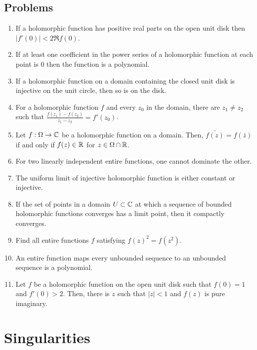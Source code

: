 \documentclass{../note}
\begin{document}
\begin{prb}
\end{prb}


\begin{prb}
\end{prb}




\section*{Problems}

\begin{enumerate}
\item If a holomorphic function has positive real parts on the open unit disk then $|f'(0)|<2\Re f(0)$.
\item If at least one coefficient in the power series of a holomorphic function at each point is 0 then the function is a polynomial.
\item If a holomorphic function on a domain containing the closed unit disk is injective on the unit circle, then so is on the disk.
\item For a holomorphic function $f$ and every $z_0$ in the domain, there are $z_1\ne z_2$ such that $\frac{f(z_1)-f(z_2)}{z_1-z_2}=f'(z_0)$.
\item Let $f:\Omega\to\mathbb{C}$ be a holomorphic function on a domain. Then, $\bar{f(z)}=f(\bar z)$ if and only if $f(z)\in\mathbb{R}$ for $z\in\Omega\cap\mathbb{R}$.
\item For two linearly independent entire functions, one cannot dominate the other.
\item The uniform limit of injective holomorphic function is either constant or injective.
\item If the set of points in a domain $U\subset\mathbb{C}$ at which a sequence of bounded holomorphic functions converges has a limit point, then it compactly converges.
\item Find all entire functions $f$ satisfying $f(z)^2=f(z^2)$.
\item An entire function maps every unbounded sequence to an unbounded sequence is a polynomial.
\item Let $f$ be a holomorphic function on the open unit disk such that $f(0)=1$ and $f'(0)>2$. Then, there is $z$ such that $|z|<1$ and $f(z)$ is pure imaginary.
\end{enumerate}



\chapter{Singularities}
\end{document}
